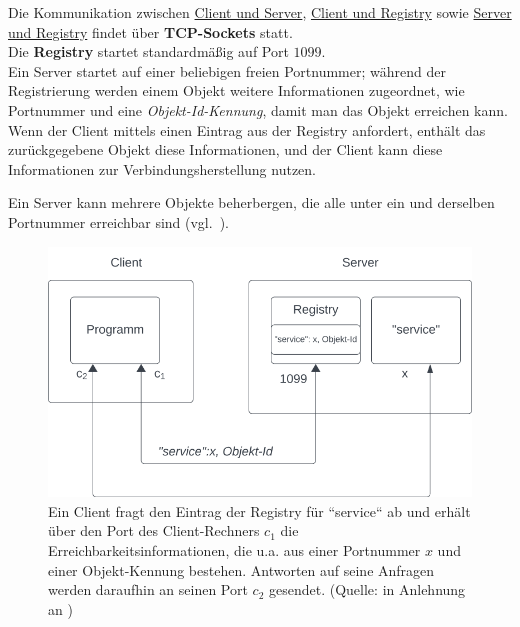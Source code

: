 \noindent
Die Kommunikation zwischen \ul{Client und Server}, \ul{Client und Registry} sowie \ul{Server und Registry} findet über \textbf{TCP-Sockets} statt.\\

\noindent
Die \textbf{Registry} startet standardmäßig auf Port $1099$.\\

\noindent
Ein Server startet auf einer beliebigen freien Portnummer; während der Registrierung werden einem Objekt weitere Informationen zugeordnet, wie Portnummer und eine \textit{Objekt-Id-Kennung}, damit man das Objekt erreichen kann.\\
Wenn der Client mittels  einen Eintrag aus der Registry anfordert, enthält das zurückgegebene Objekt diese Informationen, und der Client kann diese Informationen zur Verbindungsherstellung nutzen.\\

\begin{tcolorbox}
    Ein Server kann mehrere Objekte beherbergen, die alle unter ein und derselben Portnummer erreichbar sind (vgl.~\cite[324]{Oec22}).
\end{tcolorbox}

\begin{figure}
    \centering
    \includegraphics[scale=0.5]{chapters/fopt5/img/rmi/registry}
    \caption{Ein Client fragt den Eintrag der Registry für ``service`` ab und erhält über den Port des Client-Rechners $c_1$ die Erreichbarkeitsinformationen, die u.a. aus einer Portnummer $x$ und einer Objekt-Kennung bestehen.
    Antworten auf seine Anfragen werden daraufhin an seinen Port $c_2$ gesendet. (Quelle: in Anlehnung an \cite[324, Bild 6.5]{Oec22})}
    \label{fig:registry}
\end{figure}

